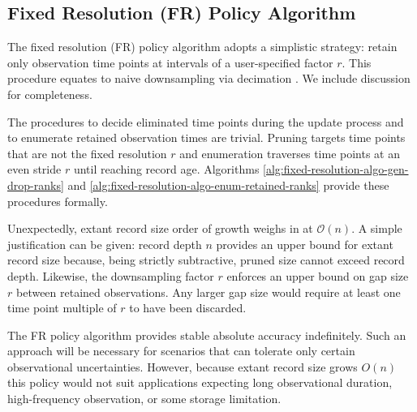 \subsection{Fixed Resolution (FR) Policy Algorithm}
\label{sec:fixed-resolution-algo}

The fixed resolution (FR) policy algorithm adopts a simplistic strategy: retain only observation time points at intervals of a user-specified factor $r$.
This procedure equates to naive downsampling via decimation \citep[p. 31]{crochiere1983multirate}.
We include discussion for completeness.




The procedures to decide eliminated time points during the update process and to enumerate retained observation times are trivial.
Pruning targets time points that are not the fixed resolution $r$ and enumeration traverses time points at an even stride $r$ until reaching record age.
Algorithms \ref{alg:fixed-resolution-algo-gen-drop-ranks} and \ref{alg:fixed-resolution-algo-enum-retained-ranks} provide these procedures formally.

Unexpectedly, extant record size order of growth weighs in at $\mathcal{O}(n)$.
A simple justification can be given: record depth $n$ provides an upper bound for extant record size because, being strictly subtractive, pruned size cannot exceed record depth.
Likewise, the downsampling factor $r$ enforces an upper bound on gap size $r$ between retained observations.
Any larger gap size would require at least one time point multiple of $r$ to have been discarded.
% 
% 

The FR policy algorithm provides stable absolute accuracy indefinitely.
Such an approach will be necessary for scenarios that can tolerate only certain observational uncertainties.
However, because extant record size grows $O(n)$ this policy would not suit applications expecting long observational duration, high-frequency observation, or some storage limitation.
